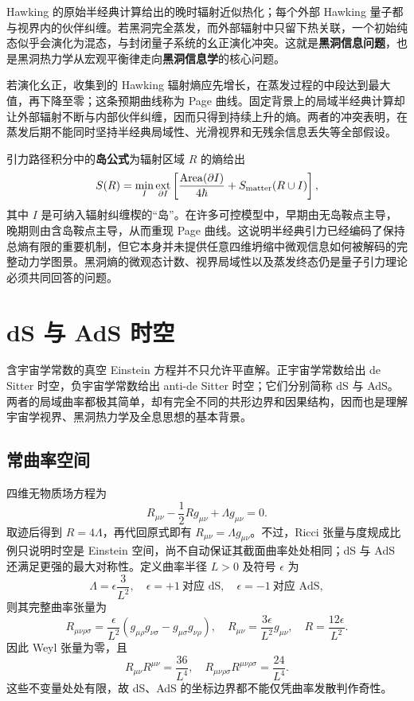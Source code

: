 Hawking 的原始半经典计算给出的晚时辐射近似热化；每个外部 Hawking 量子都与视界内的伙伴纠缠。若黑洞完全蒸发，而外部辐射中只留下热关联，一个初始纯态似乎会演化为混态，与封闭量子系统的幺正演化冲突。这就是\textbf{黑洞信息问题}，也是黑洞热力学从宏观平衡律走向\textbf{黑洞信息学}的核心问题。

若演化幺正，收集到的 Hawking 辐射熵应先增长，在蒸发过程的中段达到最大值，再下降至零；这条预期曲线称为 Page 曲线。固定背景上的局域半经典计算却让外部辐射不断与内部伙伴纠缠，因而只得到持续上升的熵。两者的冲突表明，在蒸发后期不能同时坚持半经典局域性、光滑视界和无残余信息丢失等全部假设。

引力路径积分中的\textbf{岛公式}为辐射区域 $R$ 的熵给出
\begin{equation}
    S(R)=\min_I\underset{\partial I}{\operatorname{ext}}
    \left[\frac{\operatorname{Area}(\partial I)}{4\hbar}
      +S_{\rm matter}(R\cup I)\right],
\end{equation}
其中 $I$ 是可纳入辐射纠缠楔的“岛”。在许多可控模型中，早期由无岛鞍点主导，晚期则由含岛鞍点主导，从而重现 Page 曲线。这说明半经典引力已经编码了保持总熵有限的重要机制，但它本身并未提供任意四维坍缩中微观信息如何被解码的完整动力学图景。黑洞熵的微观态计数、视界局域性以及蒸发终态仍是量子引力理论必须共同回答的问题。


\section{dS 与 AdS 时空}

含宇宙学常数的真空 Einstein 方程并不只允许平直解。正宇宙学常数给出 de Sitter 时空，负宇宙学常数给出 anti-de Sitter 时空；它们分别简称 dS 与 AdS。两者的局域曲率都极其简单，却有完全不同的共形边界和因果结构，因而也是理解宇宙学视界、黑洞热力学及全息思想的基本背景。

\subsection{常曲率空间}

四维无物质场方程为
\begin{equation}
    R_{\mu\nu}-\frac12 R g_{\mu\nu}+\Lambda g_{\mu\nu}=0.
\end{equation}
取迹后得到 $R=4\Lambda$，再代回原式即有 $R_{\mu\nu}=\Lambda g_{\mu\nu}$。不过，Ricci 张量与度规成比例只说明时空是 Einstein 空间，尚不自动保证其截面曲率处处相同；dS 与 AdS 还满足更强的最大对称性。定义曲率半径 $L>0$ 及符号 $\epsilon$ 为
\[
    \Lambda=\epsilon\frac{3}{L^2},\quad
    \epsilon=+1\ \text{对应 dS},\quad
    \epsilon=-1\ \text{对应 AdS},
\]
则其完整曲率张量为
\begin{equation}
    R_{\mu\nu\rho\sigma}
      =\frac{\epsilon}{L^2}
       \left(g_{\mu\rho}g_{\nu\sigma}-g_{\mu\sigma}g_{\nu\rho}\right),
    \quad
    R_{\mu\nu}=\frac{3\epsilon}{L^2}g_{\mu\nu},
    \quad
    R=\frac{12\epsilon}{L^2}.
\end{equation}
因此 Weyl 张量为零，且
\[
    R_{\mu\nu}R^{\mu\nu}=\frac{36}{L^4},\quad
    R_{\mu\nu\rho\sigma}R^{\mu\nu\rho\sigma}=\frac{24}{L^4}.
\]
这些不变量处处有限，故 dS、AdS 的坐标边界都不能仅凭曲率发散判作奇性。

